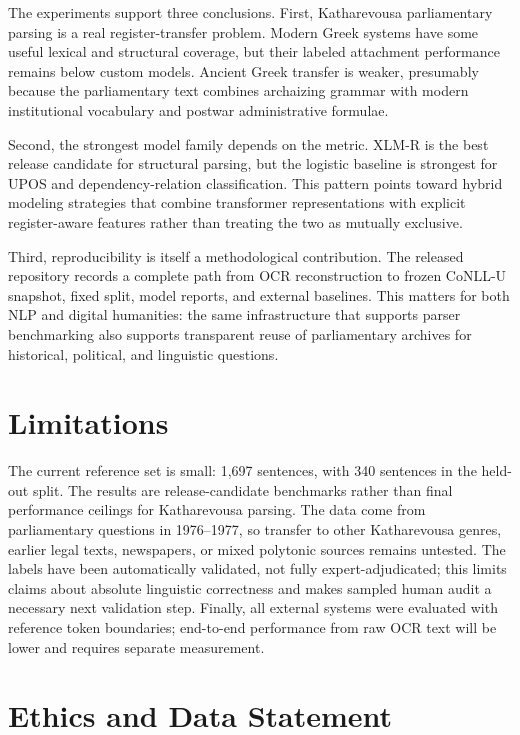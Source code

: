 \documentclass[11pt]{article}
\begin{document}
The experiments support three conclusions. First, Katharevousa parliamentary parsing is a real register-transfer problem. Modern Greek systems have some useful lexical and structural coverage, but their labeled attachment performance remains below custom models. Ancient Greek transfer is weaker, presumably because the parliamentary text combines archaizing grammar with modern institutional vocabulary and postwar administrative formulae.

Second, the strongest model family depends on the metric. XLM-R is the best release candidate for structural parsing, but the logistic baseline is strongest for UPOS and dependency-relation classification. This pattern points toward hybrid modeling strategies that combine transformer representations with explicit register-aware features rather than treating the two as mutually exclusive.

Third, reproducibility is itself a methodological contribution. The released repository records a complete path from OCR reconstruction to frozen CoNLL-U snapshot, fixed split, model reports, and external baselines. This matters for both NLP and digital humanities: the same infrastructure that supports parser benchmarking also supports transparent reuse of parliamentary archives for historical, political, and linguistic questions.

\section{Limitations}

The current reference set is small: 1{,}697 sentences, with 340 sentences in the held-out split. The results are release-candidate benchmarks rather than final performance ceilings for Katharevousa parsing. The data come from parliamentary questions in 1976--1977, so transfer to other Katharevousa genres, earlier legal texts, newspapers, or mixed polytonic sources remains untested. The labels have been automatically validated, not fully expert-adjudicated; this limits claims about absolute linguistic correctness and makes sampled human audit a necessary next validation step. Finally, all external systems were evaluated with reference token boundaries; end-to-end performance from raw OCR text will be lower and requires separate measurement.

\section{Ethics and Data Statement}
\end{document}
